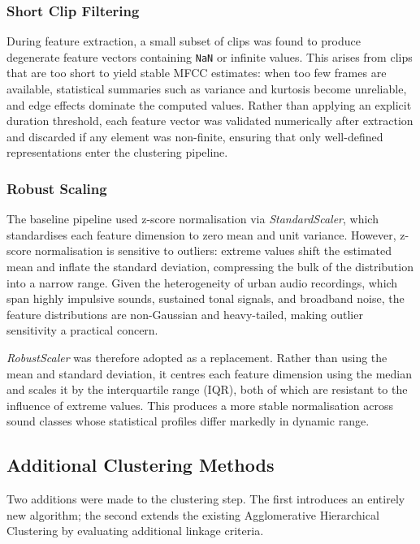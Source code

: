 \documentclass[runningheads,a4paper,11pt]{report}
\begin{document}
\subsubsection{Short Clip Filtering}

During feature extraction, a small subset of clips was found to produce degenerate feature vectors containing \texttt{NaN} or infinite values. This arises from clips that are too short to yield stable MFCC estimates: when too few frames are available, statistical summaries such as variance and kurtosis become unreliable, and edge effects dominate the computed values. Rather than applying an explicit duration threshold, each feature vector was validated numerically after extraction and discarded if any element was non-finite, ensuring that only well-defined representations enter the clustering pipeline.

\subsubsection{Robust Scaling}

The baseline pipeline used z-score normalisation via \textit{StandardScaler}, which standardises each feature dimension to zero mean and unit variance. However, z-score normalisation is sensitive to outliers: extreme values shift the estimated mean and inflate the standard deviation, compressing the bulk of the distribution into a narrow range. Given the heterogeneity of urban audio recordings, which span highly impulsive sounds, sustained tonal signals, and broadband noise, the feature distributions are non-Gaussian and heavy-tailed, making outlier sensitivity a practical concern.

\textit{RobustScaler} was therefore adopted as a replacement. Rather than using the mean and standard deviation, it centres each feature dimension using the median and scales it by the interquartile range (IQR), both of which are resistant to the influence of extreme values. This produces a more stable normalisation across sound classes whose statistical profiles differ markedly in dynamic range.

\subsection{Additional Clustering Methods}
\label{section:additionalClustering}

Two additions were made to the clustering step. The first introduces an entirely new algorithm; the second extends the existing Agglomerative Hierarchical Clustering by evaluating additional linkage criteria.
\end{document}
